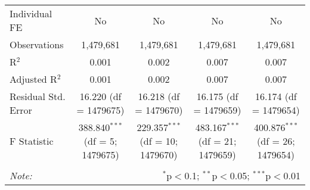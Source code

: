 \documentclass[
]{article}
\begin{document}
\begin{table}[!htbp]
{\begin{tabular}{@{\extracolsep{5pt}}lcccc}
Individual FE & No & No & No & No \\ 
Observations & 1,479,681 & 1,479,681 & 1,479,681 & 1,479,681 \\ 
R$^{2}$ & 0.001 & 0.002 & 0.007 & 0.007 \\ 
Adjusted R$^{2}$ & 0.001 & 0.002 & 0.007 & 0.007 \\ 
Residual Std. Error & 16.220 (df = 1479675) & 16.218 (df = 1479670) & 16.175 (df = 1479659) & 16.174 (df = 1479654) \\ 
F Statistic & 388.840$^{***}$ (df = 5; 1479675) & 229.357$^{***}$ (df = 10; 1479670) & 483.167$^{***}$ (df = 21; 1479659) & 400.876$^{***}$ (df = 26; 1479654) \\ 
\hline 
\hline \\[-1.8ex] 
\textit{Note:}  & \multicolumn{4}{r}{$^{*}$p$<$0.1; $^{**}$p$<$0.05; $^{***}$p$<$0.01} \\ 
\end{tabular}
} 
\end{table} 
\newpage
\end{document}
